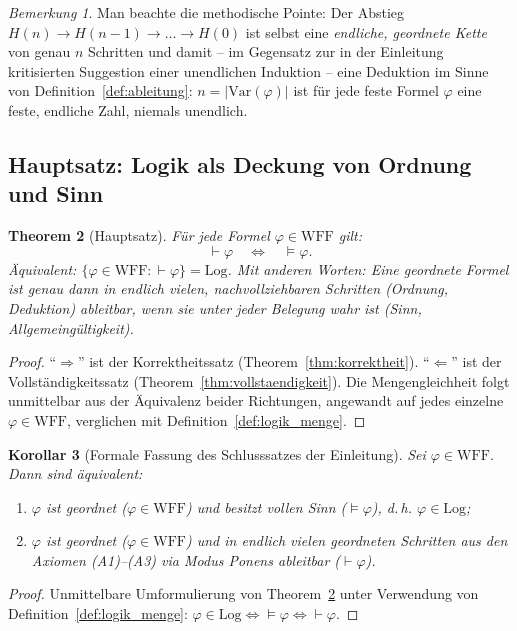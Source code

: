 \documentclass[12pt, a4paper]{article}
\newtheorem{theorem}{Theorem}[section]
\newtheorem{corollary}[theorem]{Korollar}
\theoremstyle{definition}
\theoremstyle{remark}
\newtheorem{remark}[theorem]{Bemerkung}
\newcommand{\WFF}{\mathrm{WFF}}
\newcommand{\Var}{\mathrm{Var}}
\newcommand{\Log}{\mathrm{Log}}
\begin{document}
\begin{remark}
\label{rem:abstieg_ist_deduktion}
Man beachte die methodische Pointe: Der Abstieg $H(n) \to H(n-1) \to \dots \to H(0)$ ist selbst eine \emph{endliche, geordnete Kette} von genau $n$ Schritten und damit -- im Gegensatz zur in der Einleitung kritisierten Suggestion einer unendlichen Induktion -- eine Deduktion im Sinne von Definition~\ref{def:ableitung}: $n = |\Var(\varphi)|$ ist für jede feste Formel $\varphi$ eine feste, endliche Zahl, niemals unendlich.
\end{remark}

\subsection{Hauptsatz: Logik als Deckung von Ordnung und Sinn}
\label{subsec:hauptsatz}

\begin{theorem}[Hauptsatz]
\label{thm:hauptsatz}
Für jede Formel $\varphi \in \WFF$ gilt:
\[
  \vdash \varphi \quad \Longleftrightarrow \quad \models \varphi.
\]
Äquivalent: $\{\varphi \in \WFF : \vdash\varphi\} = \Log$. Mit anderen Worten: Eine geordnete Formel ist genau dann in endlich vielen, nachvollziehbaren Schritten (Ordnung, Deduktion) ableitbar, wenn sie unter jeder Belegung wahr ist (Sinn, Allgemeingültigkeit).
\end{theorem}
\begin{proof}
``$\Rightarrow$'' ist der Korrektheitssatz (Theorem~\ref{thm:korrektheit}). ``$\Leftarrow$'' ist der Vollständigkeitssatz (Theorem~\ref{thm:vollstaendigkeit}). Die Mengengleichheit folgt unmittelbar aus der Äquivalenz beider Richtungen, angewandt auf jedes einzelne $\varphi \in \WFF$, verglichen mit Definition~\ref{def:logik_menge}.
\end{proof}

\begin{corollary}[Formale Fassung des Schlusssatzes der Einleitung]
\label{cor:logisch}
Sei $\varphi \in \WFF$. Dann sind äquivalent:
\begin{enumerate}[label=(\arabic*)]
  \item $\varphi$ ist geordnet ($\varphi \in \WFF$) und besitzt vollen Sinn ($\models\varphi$), d.\,h. $\varphi \in \Log$;
  \item $\varphi$ ist geordnet ($\varphi\in\WFF$) und in endlich vielen geordneten Schritten aus den Axiomen (A1)--(A3) via Modus Ponens ableitbar ($\vdash\varphi$).
\end{enumerate}
\end{corollary}
\begin{proof}
Unmittelbare Umformulierung von Theorem~\ref{thm:hauptsatz} unter Verwendung von Definition~\ref{def:logik_menge}: $\varphi\in\Log \Leftrightarrow \models\varphi \Leftrightarrow \vdash\varphi$.
\end{proof}
\end{document}
